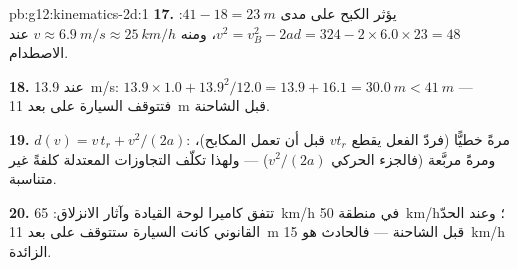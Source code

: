 \begin{solution}{pb:g12:kinematics-2d:1}
\textbf{17.} يؤثر الكبح على مدى $41 - 18 = \qty{23}{m}$:
$v^2 = v_B^2 - 2ad = 324 - 2 \times 6.0 \times 23 = 48$، ومنه
$v \approx \qty{6.9}{m/s} \approx \qty{25}{km/h}$ عند الاصطدام.

\textbf{18.} عند \qty{13.9}{m/s}: $13.9 \times 1.0 + 13.9^2/12.0 =
13.9 + 16.1 = \qty{30.0}{m} < \qty{41}{m}$ --- فتتوقف السيارة
على بعد \qty{11}{m} قبل الشاحنة.

\textbf{19.} $d(v) = v\,t_r + v^2/(2a)$: مرةً خطيًّا (فردّ الفعل
يقطع $v t_r$ قبل أن تعمل المكابح)، ومرةً مربَّعة (فالجزء
الحركي $v^2/(2a)$) --- ولهذا تكلّف التجاوزات المعتدلة
كلفةً غير متناسبة.

\textbf{20.} تتفق كاميرا لوحة القيادة وآثار الانزلاق: \qty{65}{km/h} في
منطقة \qty{50}{km/h}؛ وعند الحدّ القانوني كانت السيارة ستتوقف
على بعد \qty{11}{m} قبل الشاحنة --- فالحادث هو \qty{15}{km/h}
الزائدة.
\end{solution}
